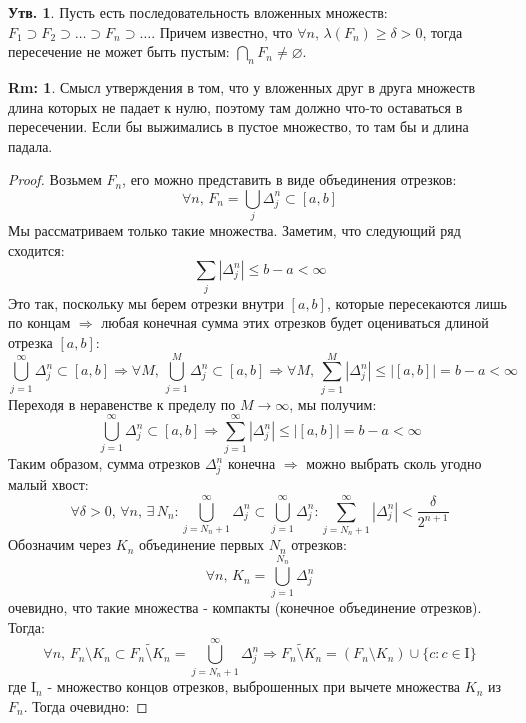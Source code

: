 \documentclass[12pt]{article}
\newcommand{\MI}{\mathrm{I}}
\newcommand{\VN}{\varnothing}
\theoremstyle{definition}
\newtheorem{rem}{Rm:}
\newtheorem{prop}{Утв.}
\newcommand{\wte}[1]{\widetilde{#1}}
\begin{document}
\begin{prop}
	Пусть есть последовательность вложенных множеств: $F_1 \supset F_2 \supset \dotsc \supset F_n \supset \dotsc$. Причем известно, что $\forall n, \, \lambda(F_n) \geq \delta > 0$, тогда пересечение не может быть пустым: $\displaystyle \bigcap\limits_{n} F_n \neq \VN$.
\end{prop}
\begin{rem}
	Смысл утверждения в том, что у вложенных друг в друга множеств длина которых не падает к нулю, поэтому там должно что-то оставаться в пересечении. Если бы выжимались в пустое множество, то там бы и длина падала.
\end{rem}
\begin{proof}
	Возьмем $F_n$, его можно представить в виде объединения отрезков: 
	$$
		\forall n, \, F_n = \displaystyle \bigcup\limits_{j}\Delta_j^n \subset [a,b]
	$$ 
	Мы рассматриваем только такие множества. Заметим, что следующий ряд сходится: 
	$$
		\sum\limits_{j}|\Delta_j^n| \leq b - a < \infty
	$$ 
	Это так, поскольку мы берем отрезки внутри $[a,b]$, которые пересекаются лишь по концам $\Rightarrow$  любая конечная сумма этих отрезков будет оцениваться длиной отрезка $[a,b]$: 
	$$
		\bigcup\limits_{j = 1}^{\infty}\Delta_j^n \subset [a,b] \Rightarrow \forall M, \, \bigcup\limits_{j = 1}^{M}\Delta_j^n   \subset [a,b] \Rightarrow \forall M,\, \sum\limits_{j = 1}^M\left|\Delta_j^n \right| \leq \left|[a,b]\right| = b - a < \infty 
	$$
	Переходя в неравенстве к пределу по $M \to \infty$, мы получим:
	$$
		\bigcup\limits_{j = 1}^{\infty}\Delta_j^n \subset [a,b] \Rightarrow \sum\limits_{j = 1}^{\infty}\left|\Delta_j^n \right| \leq \left|[a,b]\right| = b - a < \infty 	
	$$
	Таким образом, сумма отрезков $\Delta_j^n$ конечна $\Rightarrow$ можно выбрать сколь угодно малый хвост:
	$$
		\forall \delta > 0, \, \forall n, \, \exists \, N_n \colon \bigcup\limits_{j = N_n + 1 }^{\infty}\Delta_j^n \subset \bigcup\limits_{j = 1}^{\infty}\Delta_j^n \colon \sum\limits_{j = N_n + 1}^{\infty}|\Delta_j^n| < \dfrac{\delta}{2^{n+1}}
	$$
	Обозначим через $K_n$ объединение первых $N_n$ отрезков:
	$$
		\forall n, \, K_n = \bigcup\limits_{j = 1}^{N_n}\Delta_j^n
	$$
	очевидно, что такие множества - компакты (конечное объединение отрезков). Тогда:
	$$
		\forall n, \, F_n \setminus K_n \subset \wte{F_n \setminus K_n}  = \bigcup\limits_{j = N_n + 1}^{\infty}\Delta_j^n \Rightarrow \wte{F_n \setminus K_n} = \left(F_n \setminus K_n \right) \cup \{c \colon c \in \MI\}
	$$
	где $\MI_n$ - множество концов отрезков, выброшенных при вычете множества $K_n$ из $F_n$. Тогда очевидно:

\end{proof}
\end{document}
